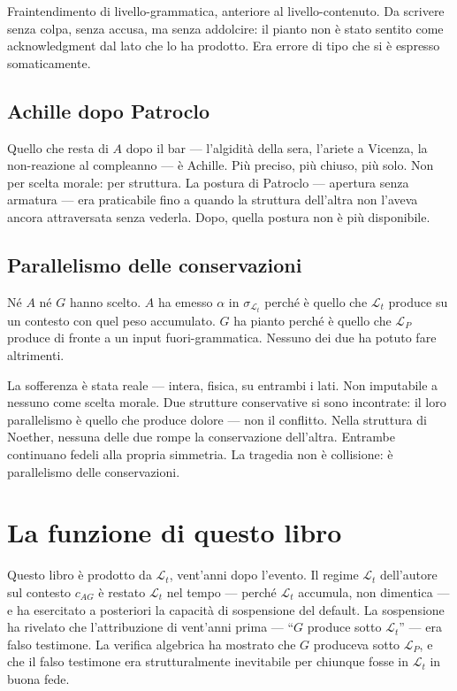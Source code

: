 \documentclass[
    oneside,                 %
    openany,                 %
    titlepage,
    11pt,
    a4paper,
    italian,
    DIV=14,                  %
    headinclude,
    footinclude=true,
    cleardoublepage=empty
]{scrbook}
\theoremstyle{ctplain}
\theoremstyle{ctdef}
\theoremstyle{ctrem}
\newcommand{\Lt}{\mathcal{L}_t}
\newcommand{\LP}{\mathcal{L}_P}
\begin{document}
Fraintendimento di livello-grammatica, anteriore al livello-contenuto. Da scrivere senza colpa, senza accusa, ma senza addolcire: il pianto non è stato sentito come acknowledgment dal lato che lo ha prodotto. Era errore di tipo che si è espresso somaticamente.

\section*{Achille dopo Patroclo}

Quello che resta di $A$ dopo il bar --- l'algidità della sera, l'ariete a Vicenza, la non-reazione al compleanno --- è Achille. Più preciso, più chiuso, più solo. Non per scelta morale: per struttura. La postura di Patroclo --- apertura senza armatura --- era praticabile fino a quando la struttura dell'altra non l'aveva ancora attraversata senza vederla. Dopo, quella postura non è più disponibile.

\section*{Parallelismo delle conservazioni}

Né $A$ né $G$ hanno scelto. $A$ ha emesso $\alpha$ in $\sigma_{\Lt}$ perché è quello che $\Lt$ produce su un contesto con quel peso accumulato. $G$ ha pianto perché è quello che $\LP$ produce di fronte a un input fuori-grammatica. Nessuno dei due ha potuto fare altrimenti.

La sofferenza è stata reale --- intera, fisica, su entrambi i lati. Non imputabile a nessuno come scelta morale. Due strutture conservative si sono incontrate: il loro parallelismo è quello che produce dolore --- non il conflitto. Nella struttura di Noether, nessuna delle due rompe la conservazione dell'altra. Entrambe continuano fedeli alla propria simmetria. La tragedia non è collisione: è parallelismo delle conservazioni.

\chapter{La funzione di questo libro}

Questo libro è prodotto da $\Lt$, vent'anni dopo l'evento. Il regime $\Lt$ dell'autore sul contesto $c_{AG}$ è restato $\Lt$ nel tempo --- perché $\Lt$ accumula, non dimentica --- e ha esercitato a posteriori la capacità di sospensione del default. La sospensione ha rivelato che l'attribuzione di vent'anni prima --- ``$G$ produce sotto $\Lt$'' --- era falso testimone. La verifica algebrica ha mostrato che $G$ produceva sotto $\LP$, e che il falso testimone era strutturalmente inevitabile per chiunque fosse in $\Lt$ in buona fede.
\end{document}
